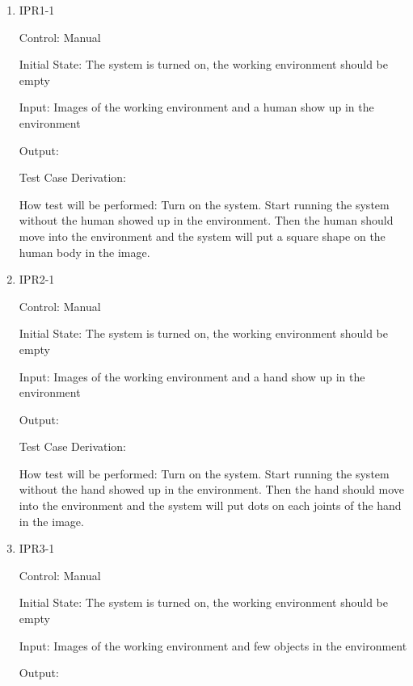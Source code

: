\documentclass[12pt, titlepage]{article}
\begin{document}
\begin{enumerate}

\item{IPR1-1\\}

Control: Manual
					
Initial State: The system is turned on, the working environment should be empty
					
Input: Images of the working environment and a human show up in the environment
					
Output: 

Test Case Derivation: 
					
How test will be performed: Turn on the system. Start running the system without the human showed up in the environment. Then the human should move into the environment and the system will put a square shape on the human body in the image.


\item{IPR2-1\\}

Control: Manual
					
Initial State: The system is turned on, the working environment should be empty
					
Input: Images of the working environment and a hand show up in the environment
					
Output: 

Test Case Derivation: 
					
How test will be performed: Turn on the system. Start running the system without the hand showed up in the environment. Then the hand should move into the environment and the system will put dots on each joints of the hand in the image.

\item{IPR3-1\\}

Control: Manual
					
Initial State: The system is turned on, the working environment should be empty
					
Input: Images of the working environment and few objects in the environment
					
Output: 


\end{enumerate}
\end{document}

